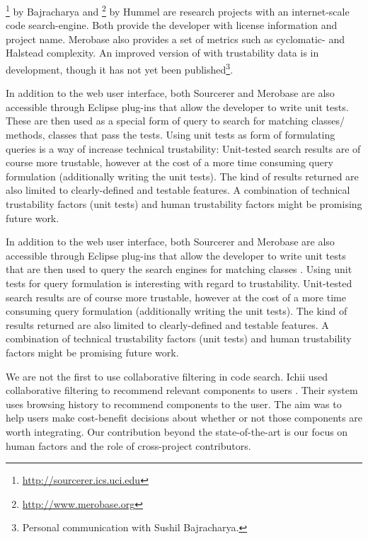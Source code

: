 \textsc{\sourcerer}\footnote{\url{http://sourcerer.ics.uci.edu}} by Bajracharya \etal \cite{Bajr06a} and \textsc{\merobase}\footnote{\url{http://www.merobase.org}} by Hummel \etal \cite{Humm08a} are research projects with an internet-scale code search-engine. Both provide the developer with license information and project name. Merobase also provides a set of metrics such as cyclomatic- and Halstead complexity.  An improved version of \sourcerer with trustability data is in development, though it has not yet been published\footnote{Personal communication with Sushil Bajracharya.}. 

In addition to the web user interface, both Sourcerer and Merobase are also accessible through Eclipse plug-ins that allow the developer to write unit tests. These are then used as a special form of query to search for matching classes/ methods, \ie classes that pass the tests\cite{Humm08a}. Using unit tests as form of formulating queries is a way of increase technical trustability: Unit-tested search results are of course more trustable, however at the cost of a more time consuming query formulation (\ie additionally writing the unit tests). The kind of results returned are also limited to clearly-defined and testable features.  A combination of technical trustability factors (\eg unit tests) and human trustability factors might be promising future work.

In addition to the web user interface, both Sourcerer and Merobase are also accessible through Eclipse plug-ins that allow the developer to write unit tests that are then used to query the search engines for matching classes \cite{Lemo07a,Humm08a}. Using unit tests for query formulation is interesting with regard to trustability. Unit-tested search results are of course more trustable, however at the cost of a more time consuming query formulation (\ie additionally writing the unit tests).  The kind of results returned are also limited to clearly-defined and testable features.  A combination of technical trustability factors (\eg unit tests) and human trustability factors might be promising future work.

We are not the first to use collaborative filtering in code search. Ichii \etal used collaborative filtering to recommend relevant components to users \cite{Ichi09a}. Their system uses browsing history to recommend components to the user. The aim was to help users make cost-benefit decisions about whether or not those components are worth integrating. Our contribution beyond the state-of-the-art is our focus on human factors and the role of cross-project contributors.

